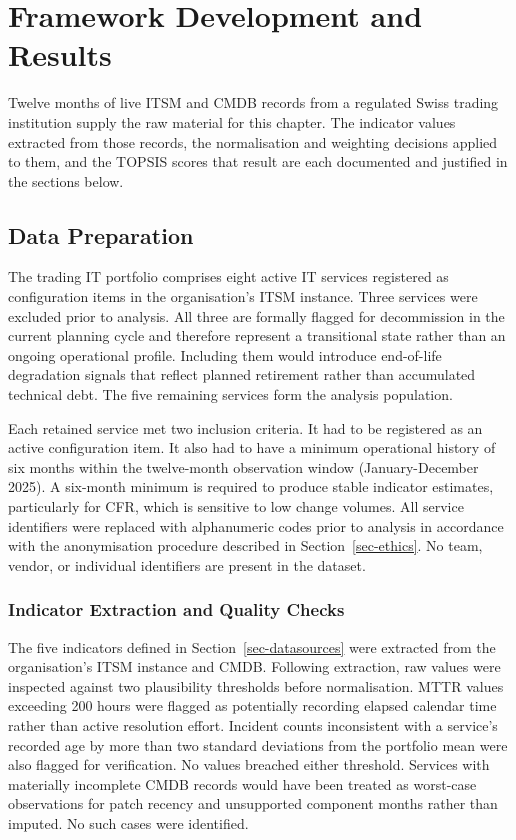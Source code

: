 \documentclass[
  12pt,
  letterpaper,
  12pt,
  oneside,
  english,
  onehalfspacing,
  headsepline]{MastersDoctoralThesis}
\begin{document}

\chapter{Framework Development and Results}\label{sec-chapter4}

Twelve months of live ITSM and CMDB records from a regulated Swiss
trading institution supply the raw material for this chapter. The
indicator values extracted from those records, the normalisation and
weighting decisions applied to them, and the TOPSIS scores that result
are each documented and justified in the sections below.

\section{Data Preparation}\label{sec-dataprep}

The trading IT portfolio comprises eight active IT services registered
as configuration items in the organisation's ITSM instance. Three
services were excluded prior to analysis. All three are formally flagged
for decommission in the current planning cycle and therefore represent a
transitional state rather than an ongoing operational profile. Including
them would introduce end-of-life degradation signals that reflect
planned retirement rather than accumulated technical debt. The five
remaining services form the analysis population.

Each retained service met two inclusion criteria. It had to be
registered as an active configuration item. It also had to have a
minimum operational history of six months within the twelve-month
observation window (January-December 2025). A six-month minimum is
required to produce stable indicator estimates, particularly for CFR,
which is sensitive to low change volumes. All service identifiers were
replaced with alphanumeric codes prior to analysis in accordance with
the anonymisation procedure described in Section~\ref{sec-ethics}. No
team, vendor, or individual identifiers are present in the dataset.

\subsection{Indicator Extraction and Quality
Checks}\label{indicator-extraction-and-quality-checks}

The five indicators defined in Section~\ref{sec-datasources} were
extracted from the organisation's ITSM instance and CMDB. Following
extraction, raw values were inspected against two plausibility
thresholds before normalisation. MTTR values exceeding 200 hours were
flagged as potentially recording elapsed calendar time rather than
active resolution effort. Incident counts inconsistent with a service's
recorded age by more than two standard deviations from the portfolio
mean were also flagged for verification. No values breached either
threshold. Services with materially incomplete CMDB records would have
been treated as worst-case observations for patch recency and
unsupported component months rather than imputed. No such cases were
identified.
\end{document}

